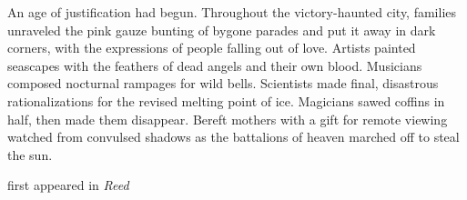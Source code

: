 An age of justification had begun. Throughout the victory-haunted city,
families unraveled the pink gauze bunting of bygone parades and put it
away in dark corners, with the expressions of people falling out of
love. Artists painted seascapes with the feathers of dead angels and
their own blood. Musicians composed nocturnal rampages for wild bells.
Scientists made final, disastrous rationalizations for the revised
melting point of ice. Magicians sawed coffins in half, then made them
disappear. Bereft mothers with a gift for remote viewing watched from
convulsed shadows as the battalions of heaven marched off to steal the
sun.

first appeared in \emph{Reed}
